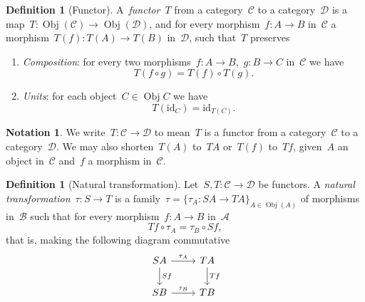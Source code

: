 \documentclass[a4paper]{article}
\theoremstyle{plain}
\theoremstyle{definition}
\newtheorem{definition}[theorem]{Definition}
\newtheorem{notation}[theorem]{Notation}
\DeclareMathOperator{\Obj}{Obj}
\newcommand{\id}{\mathrm{id}}
\newcommand{\cat}[1]{\mathcal{#1}}
\begin{document}
\begin{definition}[Functor]
    \label{def:functor}
    A~\emph{functor}~\(T\) from a category~\(\cat{C}\) to a category~\(\cat{D}\)
    is a map~\(T:\Obj(\cat{C})\longrightarrow\Obj(\cat{D})\), and for every
    morphism~\(f:A\longrightarrow B\) in~\(\cat{C}\) a
    morphism~\(T(f):T(A)\longrightarrow T(B)\) in~\(\cat{D}\), such that~\(T\)
    preserves
    \begin{enumerate}
        \item \emph{Composition}: for every two
            morphisms~\(f:A\longrightarrow B\),~\(g:B\longrightarrow C\)
            in~\(\cat{C}\) we have
            \[
                T(f \circ g) = T(f) \circ T(g).
            \]
        \item \emph{Units}: for each object~\(C\in\Obj{C}\) we have
            \[
                T(\id_{C}) = \id_{T(C)}.
            \]
    \end{enumerate}
\end{definition}

\begin{notation}
    We write~\(T:\cat{C}\longrightarrow\cat{D}\) to mean~\(T\) is a functor from
    a category~\(\cat{C}\) to a category~\(\cat{D}\).
    We may also shorten~\(T(A)\) to~\(TA\) or~\(T(f)\) to~\(Tf\), given~\(A\) an
    object in~\(\cat{C}\) and~\(f\) a morphism in~\(\cat{C}\).
\end{notation}

\begin{definition}[Natural transformation]
    \label{def:natural-transformation}
    Let~\(S,T:\cat{C}\longrightarrow\cat{D}\) be functors. A \emph{natural
    transformation}~\(\tau:S\longrightarrow T\) is a
    family~\(\tau=\{\tau_{A}:SA\longrightarrow TA\}_{A\in\Obj(A)}\) of morphisms
    in~\(\cat{B}\) such that for every morphism~\(f:A\longrightarrow B\)
    in~\(\cat{A}\)
    \[
        Tf \circ \tau_{A} = \tau_{B} \circ Sf,
    \]
    that is, making the following diagram commutative
    \[
        \begin{tikzcd}
            SA \arrow[r, "\tau_{A}"] \arrow[d, "Sf"] & TA \arrow[d, "Tf"] \\
            SB \arrow[r, "\tau_{B}"] & TB
        \end{tikzcd}
    \]
\end{definition}
\end{document}
